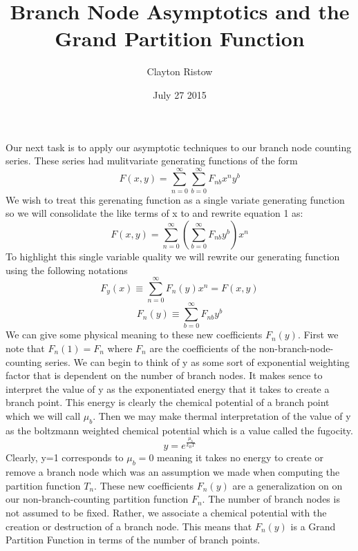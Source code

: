 \documentclass{article}
\title{Branch Node Asymptotics and the Grand Partition Function}
\author{Clayton Ristow}
\date{July 27 2015}
\begin{document}
\maketitle

Our next task is to apply our asymptotic techniques to our branch node counting series. These series had mulitvariate generating functions of the form
\begin{equation}
F(x,y)=\sum_{n=0}^\infty\sum_{b=0}^\infty F_{nb}x^ny^b
\end{equation}
We wish to treat this gerenating function as a single variate generating function so we will consolidate the like terms of x to and rewrite equation 1 as:
\begin{equation}
F(x,y)=\sum_{n=0}^\infty\left(\sum_{b=0}^\infty F_{nb}y^b\right)x^n
\end{equation}
To highlight this single variable quality we will rewrite our generating function using the following notations
\begin{equation}
F_y(x)\equiv\sum_{n=0}^\infty F_n(y)x^n =F(x,y)
\end{equation}
\begin{equation}
F_n(y) \equiv \sum_{b=0}^\infty F_{nb}y^b
\end{equation}
We can give some physical meaning to these new coefficients \(F_n(y)\). First we note that \(F_n(1)=F_n\) where \(F_n\) are the coefficients of the non-branch-node-counting series. We can begin to think of y as some sort of exponential weighting factor that is dependent on the number of branch nodes. It makes sence to interpret the value of y as the exponentiated energy that it takes to create a branch point. This energy is clearly the chemical potential of a branch point which we will call \(\mu_b\). Then we may make thermal interpretation of the value of y as the boltzmann weighted chemical potential which is a value called the fugocity. 
\begin{equation}
y=e^{\frac{\mu_b}{k_BT}}
\end{equation}
Clearly, y=1 corresponds to \(\mu_b=0\) meaning it takes no energy to create or remove a branch node which was an assumption we made when computing the partition function \(T_n\). 
These new coefficients \(F_n(y)\) are a generalization on on our non-branch-counting partition function \(F_n\). The number of branch nodes is not assumed to be fixed. Rather, we associate a chemical potential with the creation or destruction of a branch node. This means that \(F_n(y)\) is a Grand Partition Function in terms of the number of branch points. 
\end{document}
